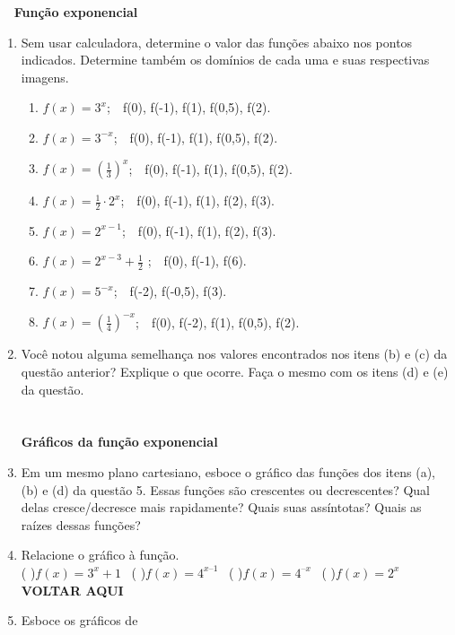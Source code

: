 \documentclass[a4paper, 11pt]{article}
\begin{document}
\textbf{\, \ Função exponencial}

\begin{enumerate}

\item Sem usar calculadora, determine o valor das funções abaixo nos pontos indicados. Determine também os domínios de cada uma e suas respectivas imagens.

		\begin{enumerate}
\item $f(x) = 3^x$; $\, \,$ f(0), f(-1), f(1), f(0,5), f(2).
\item $f(x) = {3}^{-x}$; $\, \,$ f(0), f(-1), f(1), f(0,5), f(2).
\item $f(x) = \left( \frac{1}{3} \right)^x$; $\, \,$ f(0), f(-1), f(1), f(0,5), f(2).
\item $f(x) = \frac{1}{2} \cdot 2^x$; $\, \,$ f(0), f(-1), f(1), f(2), f(3).
\item $f(x) = 2^{x-1}$; $\, \,$ f(0), f(-1), f(1), f(2), f(3).
\item $f(x) = 2^{x-3} + \frac{1}{2}$ ; $\, \,$ f(0), f(-1), f(6).
\item $f(x) = 5^{-x}$; $\, \,$ f(-2), f(-0,5), f(3).
\item $f(x) = \left( \frac{1}{4} \right)^{-x}$; $\, \,$ f(0), f(-2), f(1), f(0,5), f(2).
		\end{enumerate}

\item Você notou alguma semelhança nos valores encontrados nos itens (b) e (c) da questão anterior? Explique o que ocorre. Faça o mesmo com os itens (d) e (e) da questão.
\\
\\
\\

\textbf{Gráficos da função exponencial}

\item Em um mesmo plano cartesiano, esboce o gráfico das funções dos itens (a), (b) e (d) da questão 5. Essas funções são crescentes ou decrescentes? Qual delas cresce/decresce mais rapidamente? Quais suas assíntotas? Quais as raízes dessas funções?

\item Relacione o gráfico à função. 
\\
( )$f(x) = 3^x + 1 \, \, \,$ ( )$f(x) = 4^{x – 1} \, \, \,$ ( )$f(x) = 4^{–x} \, \, \,$ ( )$f(x) = 2^x$
\textbf{VOLTAR AQUI}

\item Esboce os gráficos de


\end{enumerate}
\end{document}
